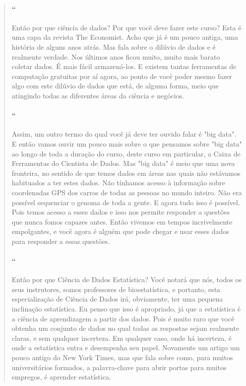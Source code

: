 \begin{quotation}
\begin{small}
\paragraph{``}
Então por que ciência de dados? Por que você deve fazer este curso? Esta é uma capa da revista The Economist. Acho que já é um pouco antiga, uma história de alguns anos atrás. Mas fala sobre o dilúvio de dados e é realmente verdade. Nos últimos anos ficou muito, muito mais barato coletar dados. É mais fácil armazená-los. E existem tantas ferramentas de computação gratuitas por aí agora, ao ponto de você poder mesmo fazer algo com este dilúvio de dados que está, de alguma forma, meio que atingindo todas as diferentes áreas da ciência e negócios. 

\paragraph{``}
Assim, um outro termo do qual você já deve ter ouvido falar é "big data". E então vamos ouvir um pouco mais sobre o que pensamos sobre "big data" ao longo de toda a duração do curso, deste curso em particular, a Caixa de Ferramentas do Cientista de Dados. Mas "big data" é meio que uma nova fronteira, no sentido de que temos dados em áreas nas quais não estávamos habituados a ter estes dados. Não tínhamos acesso à informação sobre coordenadas GPS  dos carros de todas as pessoas no mundo inteiro. Não era possível sequenciar o genoma de toda a gente. E agora tudo isso é possível. Pois temos acesso a esses dados  e isso nos permite responder a questões que nunca fomos capazes antes. Então vivemos em tempos incrivelmente empolgantes, e você agora é alguém  que pode chegar e usar esses dados para responder a essas questões. 

\paragraph{``}
Então por que Ciência de Dados Estatística? Você notará que nós, todos os seus instrutores, somos professores de bioestatística, e portanto, esta especialização de Ciência de Dados irá, obviamente, ter uma pequena inclinação estatística. Eu penso que isso é apropriado, já que a estatística é a ciência de aprendizagem a partir dos dados. Pois é muito raro que você obtenha um conjunto de dados no qual todas as respostas sejam realmente claras, e sem qualquer incerteza. Em qualquer caso, onde há incerteza, é onde a estatística entra e desempenha seu papel. Novamente um artigo um pouco antigo do New York Times, mas que fala sobre como, para muitos universitários formados, a palavra-chave para abrir portas para muitos empregos, é aprender estatística.


\end{small}
\end{quotation}
